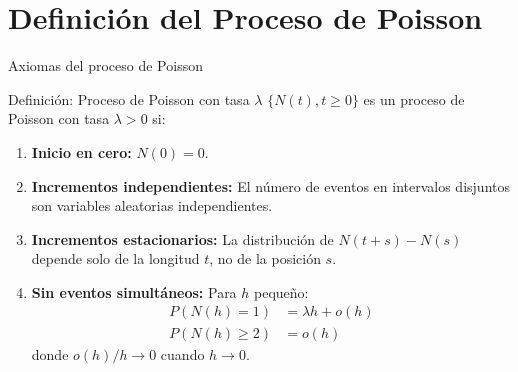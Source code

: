 \documentclass[aspectratio=1610, 9pt]{beamer}
\begin{document}
\section{Definici\'{o}n del Proceso de Poisson}

\begin{frame}{Axiomas del proceso de Poisson}

\begin{block}{Definici\'{o}n: Proceso de Poisson con tasa $\lambda$}
$\{N(t), t \geq 0\}$ es un proceso de Poisson con tasa $\lambda > 0$ si:
\end{block}

\vspace{0.2cm}
\begin{enumerate}
    \item \textbf{Inicio en cero:} $N(0) = 0$.

    \vspace{0.2cm}
    \item \textbf{Incrementos independientes:} El n\'{u}mero de eventos en intervalos disjuntos son variables aleatorias independientes.

    \vspace{0.2cm}
    \item \textbf{Incrementos estacionarios:} La distribuci\'{o}n de $N(t+s) - N(s)$ depende solo de la longitud $t$, no de la posici\'{o}n $s$.

    \vspace{0.2cm}
    \item \textbf{Sin eventos simult\'{a}neos:} Para $h$ peque\~{n}o:
    \begin{align}
        P(N(h) = 1) &= \lambda h + o(h) \\
        P(N(h) \geq 2) &= o(h)
    \end{align}
    donde $o(h)/h \to 0$ cuando $h \to 0$.
\end{enumerate}
\end{frame}
\end{document}
